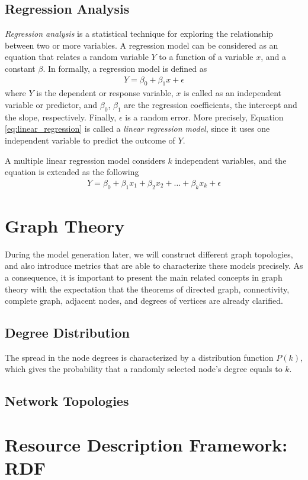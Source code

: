 \subsection{Regression Analysis}

\textit{Regression analysis} is a statistical technique for exploring the relationship between two or more variables. A regression model can be considered as an equation that relates a random variable $Y$ to a function of a variable $x$, and a constant $\beta$. In formally, a regression model is defined as
\begin{align} \label{eq:linear_regression}
	Y = \beta_0 + \beta_1x + \epsilon
\end{align}
where $Y$ is the dependent or response variable, $x$ is called as an independent variable or predictor, and $\beta_0$, $\beta_1$ are the regression coefficients, the intercept and the slope, respectively. Finally, $\epsilon$ is a random error. More precisely, Equation \ref{eq:linear_regression} is called a \textit{linear regression model}, since it uses one independent variable to predict the outcome of $Y$.

A multiple linear regression model considers $k$ independent variables, and the equation is extended as the following
\begin{align}
	Y = \beta_0 + \beta_1x_1 + \beta_2x_2 + \dots + \beta_kx_k + \epsilon
\end{align}

\section{Graph Theory}

During the model generation later, we will construct different graph topologies, and also introduce metrics that are able to characterize these models precisely. As a consequence, it is important to present the main related concepts in graph theory with the expectation that the theorems of directed graph, connectivity, complete graph, adjacent nodes, and degrees of vertices are already clarified.

\subsection{Degree Distribution}

The spread in the node degrees is characterized by a distribution
function $P(k)$, which gives the probability that a randomly selected node's degree equals to $k$.

\subsection{Network Topologies} \label{sec:topologies}




\section{Resource Description Framework: RDF} \label{section:rdf}

